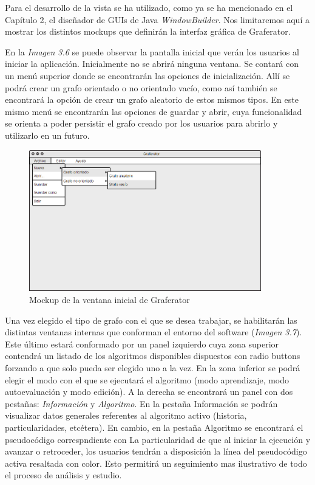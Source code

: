 \documentclass{book}
\begin{document}
Para el desarrollo de la vista se ha utilizado, como ya se ha mencionado en el Capítulo 2, el diseñador de GUIs de Java \textit{WindowBuilder}. Nos limitaremos aquí a mostrar los distintos mockups que definirán la interfaz gráfica de Graferator.
\par
En la \textit{Imagen 3.6} se puede observar la pantalla inicial que verán los usuarios al iniciar la aplicación. Inicialmente no se abrirá ninguna ventana. Se contará con un menú superior donde se encontrarán las opciones de inicialización. Allí se podrá crear un grafo orientado o no orientado vacío, como así también se encontrará la opción de crear un grafo aleatorio de estos mismos tipos. En este mismo menú se encontrarán las opciones de guardar y abrir, cuya funcionalidad se orienta a poder persistir el grafo creado por los usuarios para abrirlo y utilizarlo en un futuro.
\bigskip

\begin{figure}[H]
	\centering
	\includegraphics[width=0.9\textwidth]{images/02-01.png}
	\medskip
	\caption{Mockup de la ventana inicial de Graferator}
	\medskip
\end{figure}
\bigskip

Una vez elegido el tipo de grafo con el que se desea trabajar, se habilitarán las distintas ventanas internas que conforman el entorno del software (\textit{Imagen 3.7}). Este último estará conformado por un panel izquierdo cuya zona superior contendrá un listado de los algoritmos disponibles dispuestos con radio buttons forzando a que solo pueda ser elegido uno a la vez. En la zona inferior se podrá elegir el modo con el que se ejecutará el algoritmo (modo aprendizaje, modo autoevaluación y modo edición).
\newpage
A la derecha se encontrará un panel con dos pestañas: \textit{Información} y \textit{Algoritmo}. En la pestaña Información se podrán visualizar datos generales referentes al algoritmo activo (historia, particularidades, etcétera). En cambio, en la pestaña Algoritmo se encontrará el pseudocódigo correspndiente con La particularidad de que al iniciar la ejecución y avanzar o retroceder, los usuarios tendrán a disposición la línea del pseudocódigo activa resaltada con color. Esto permitirá un seguimiento mas ilustrativo de todo el proceso de análisis y estudio.
\end{document}
